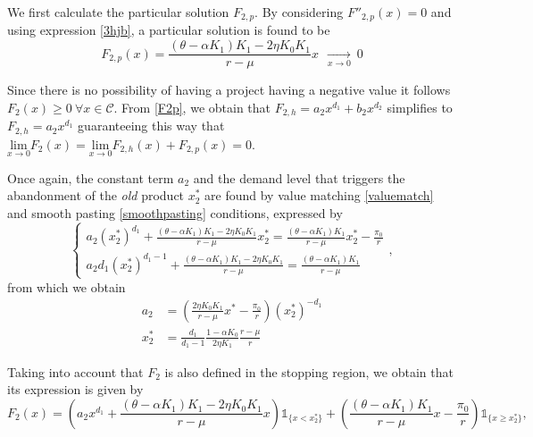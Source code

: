 We first calculate the particular solution $F_{2,p}$. By considering $F''_{2,p}(x)=0$ and using expression \eqref{3hjb}, a particular solution is found to be 
\begin{equation}
F_{2,p}(x)=\frac{(\theta-\alpha K_1)K_1-2 \eta K_0 K_1}{r-\mu}x \  \   \xrightarrow[x \rightarrow 0 ]{ } \ 0
	\label{F2p}
\end{equation}


Since there is no possibility of having a project having a negative value it follows $F_2(x) \geq 0 \ \forall x \in \mathcal{C}$. From \ref{F2p}, we obtain that $F_{2,h}=a_2 x^{d_1}+b_2 x^{d_2}$ simplifies to $F_{2,h}=a_2 x^{d_1}$ guaranteeing this way that $\underset{x \to 0}{\text{lim}} F_2(x)=\underset{x \to 0}{\text{lim}} F_{2,h}(x)+F_{2,p}(x)=0$.

Once again, the constant term $a_2$ and the demand level that triggers the abandonment of the \textit{old} product $x_2^*$ are found by value matching \eqref{valuematch} and smooth pasting \eqref{smoothpasting} conditions, expressed by
\begin{equation}
\begin{cases}
a_2(x_2^*)^{d_1}+\frac{(\theta-\alpha K_1)K_1-2 \eta K_0 K_1}{r-\mu}x_2^*=\frac{(\theta-\alpha K_1)K_1}{r-\mu} x_2^* -\frac{\pi_0}{r} \\
a_2 d_1(x_2^*)^{d_1-1}+\frac{(\theta-\alpha K_1)K_1-2 \eta K_0 K_1}{r-\mu}=\frac{(\theta-\alpha K_1)K_1}{r-\mu}
\end{cases},
\end{equation}
from which we obtain
\begin{align}
a_2 &= \left( \frac{2\eta K_0 K_1}{r-\mu}x^*-\frac{\pi_0}{r} \right)(x_2^*)^{-d_1} \nonumber \\
x_2^*&=\frac{d_1}{d_1-1} \frac{1-\alpha K_0}{2 \eta K_1} \frac{r-\mu}{r} \label{3:x2}
\end{align}

Taking into account that $F_2$ is also defined in the stopping region, we obtain that its expression is given by
\begin{equation}
F_2(x)=\left( a_2 x^{d_1} +\frac{(\theta-\alpha K_1)K_1-2 \eta K_0 K_1}{r-\mu}x \right) \mathds{1}_{ \{ x<x_2^* \} }+ \left( \frac{(\theta-\alpha K_1)K_1}{r-\mu} x -\frac{\pi_0}{r} \right)\mathds{1}_{ \{ x\geq x_2^* \} },
\label{eq:f2}
\end{equation}


